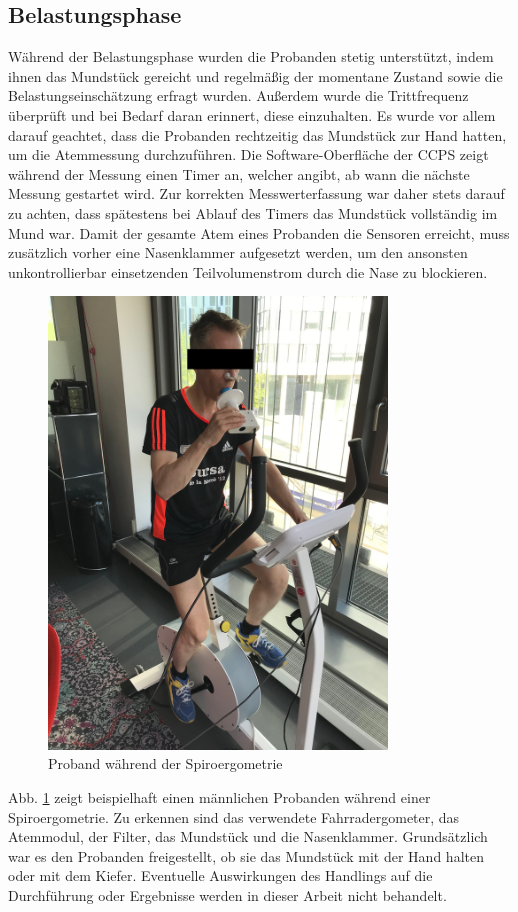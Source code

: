 \subsection{Belastungsphase}
%
Während der Belastungsphase wurden die Probanden stetig unterstützt, indem ihnen das Mundstück gereicht und regelmäßig der momentane Zustand sowie die Belastungseinschätzung erfragt wurden. Außerdem wurde die Trittfrequenz überprüft und bei Bedarf daran erinnert, diese einzuhalten. Es wurde vor allem darauf geachtet, dass die Probanden rechtzeitig das Mundstück zur Hand hatten, um die Atemmessung durchzuführen. Die Software-Oberfläche der \acs{CCPS} zeigt während der Messung einen Timer an, welcher angibt, ab wann die nächste Messung gestartet wird. Zur korrekten Messwerterfassung war daher stets darauf zu achten, dass spätestens bei Ablauf des Timers das Mundstück vollständig im Mund war. Damit der gesamte Atem eines Probanden die Sensoren erreicht, muss zusätzlich vorher eine Nasenklammer aufgesetzt werden, um den ansonsten unkontrollierbar einsetzenden Teilvolumenstrom durch die Nase zu blockieren.
%
\begin{figure}[H]
	\centering
	\includegraphics[width=90mm]{Bilder/proband.jpg}
	\caption{Proband während der Spiroergometrie}
	\label{pic:pic11}
\end{figure}
%
Abb. \ref{pic:pic11} zeigt beispielhaft einen männlichen Probanden während einer Spiroergometrie. Zu erkennen sind das verwendete Fahrradergometer, das Atemmodul, der Filter, das Mundstück und die Nasenklammer. Grundsätzlich war es den Probanden freigestellt, ob sie das Mundstück mit der Hand halten oder mit dem Kiefer. Eventuelle Auswirkungen des Handlings auf die Durchführung oder Ergebnisse werden in dieser Arbeit nicht behandelt.\\
